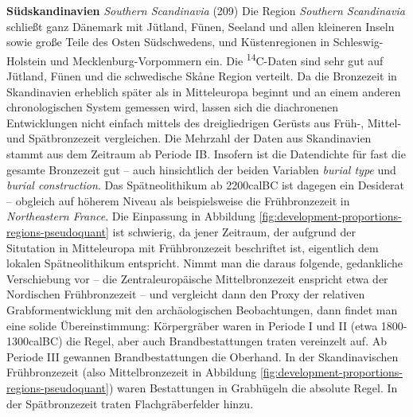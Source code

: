\documentclass[openany,twoside,twocolumn]{book}
\begin{document}
\textbf{Südskandinavien} \emph{Southern Scandinavia} (209) \newline 
Die Region \emph{Southern Scandinavia} schließt ganz Dänemark mit Jütland, Fünen, Seeland und allen kleineren Inseln sowie große Teile des Osten Südschwedens, und Küstenregionen in Schleswig-Holstein und Mecklenburg-Vorpommern ein. Die \textsuperscript{14}C-Daten sind sehr gut auf Jütland, Fünen und die schwedische Skåne Region verteilt. Da die Bronzezeit in Skandinavien erheblich später als in Mitteleuropa beginnt und an einem anderen chronologischen System gemessen wird, lassen sich die diachronenen Entwicklungen nicht einfach mittels des dreigliedrigen Gerüsts aus Früh-, Mittel- und Spätbronzezeit vergleichen. Die Mehrzahl der Daten aus Skandinavien stammt aus dem Zeitraum ab Periode IB. Insofern ist die Datendichte für fast die gesamte Bronzezeit gut -- auch hinsichtlich der beiden Variablen \emph{burial type} und \emph{burial construction}. Das Spätneolithikum ab 2200calBC ist dagegen ein Desiderat -- obgleich auf höherem Niveau als beispielsweise die Frühbronzezeit in \emph{Northeastern France}. Die Einpassung in Abbildung \ref{fig:development-proportions-regions-pseudoquant} ist schwierig, da jener Zeitraum, der aufgrund der Situtation in Mitteleuropa mit Frühbronzezeit beschriftet ist, eigentlich dem lokalen Spätneolithikum entspricht. Nimmt man die daraus folgende, gedankliche Verschiebung vor -- die Zentraleuropäische Mittelbronzezeit enspricht etwa der Nordischen Frühbronzezeit -- und vergleicht dann den Proxy der relativen Grabformentwicklung mit den archäologischen Beobachtungen, dann findet man eine solide Übereinstimmung: Körpergräber waren in Periode I und II (etwa 1800-1300calBC) die Regel, aber auch Brandbestattungen traten vereinzelt auf. Ab Periode III gewannen Brandbestattungen die Oberhand. In der Skandinavischen Frühbronzezeit (also Mittelbronzezeit in Abbildung \ref{fig:development-proportions-regions-pseudoquant}) waren Bestattungen in Grabhügeln die absolute Regel. In der Spätbronzezeit traten Flachgräberfelder hinzu.
\end{document}
